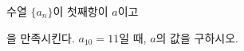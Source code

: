 \hspace*{2mm}\begin{minipage}[t]{\dimexpr\linewidth-2mm\relax}\vspace{0pt}
수열 $\{a_n\}$이 첫째항이 $a$이고 \par\smallskip{}\par\smallskip\noindent 을 만족시킨다. $a_{10}=11$일 때, $a$의 값을 구하시오.\end{minipage}
